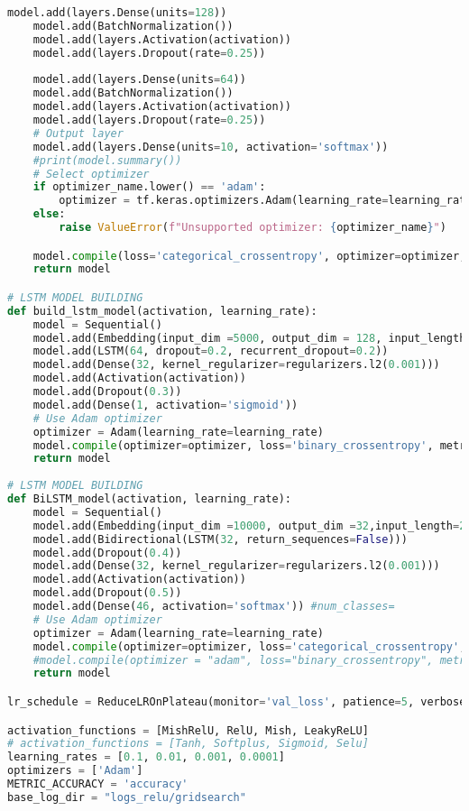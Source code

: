 \begin{lstlisting}[language=Python, ]
    model.add(layers.Dense(units=128))
    model.add(BatchNormalization())
    model.add(layers.Activation(activation))
    model.add(layers.Dropout(rate=0.25))
    
    model.add(layers.Dense(units=64))
    model.add(BatchNormalization())
    model.add(layers.Activation(activation))
    model.add(layers.Dropout(rate=0.25))
    # Output layer
    model.add(layers.Dense(units=10, activation='softmax'))
    #print(model.summary())
    # Select optimizer 
    if optimizer_name.lower() == 'adam':
        optimizer = tf.keras.optimizers.Adam(learning_rate=learning_rate)
    else:
        raise ValueError(f"Unsupported optimizer: {optimizer_name}")

    model.compile(loss='categorical_crossentropy', optimizer=optimizer, metrics=['accuracy'])
    return model

# LSTM MODEL BUILDING
def build_lstm_model(activation, learning_rate):
    model = Sequential()
    model.add(Embedding(input_dim =5000, output_dim = 128, input_length = 200))
    model.add(LSTM(64, dropout=0.2, recurrent_dropout=0.2))
    model.add(Dense(32, kernel_regularizer=regularizers.l2(0.001)))
    model.add(Activation(activation))
    model.add(Dropout(0.3))
    model.add(Dense(1, activation='sigmoid'))
    # Use Adam optimizer 
    optimizer = Adam(learning_rate=learning_rate)
    model.compile(optimizer=optimizer, loss='binary_crossentropy', metrics=['accuracy'])
    return model
    
# LSTM MODEL BUILDING
def BiLSTM_model(activation, learning_rate):
    model = Sequential()
    model.add(Embedding(input_dim =10000, output_dim =32,input_length=200))
    model.add(Bidirectional(LSTM(32, return_sequences=False)))
    model.add(Dropout(0.4))
    model.add(Dense(32, kernel_regularizer=regularizers.l2(0.001)))
    model.add(Activation(activation))
    model.add(Dropout(0.5))
    model.add(Dense(46, activation='softmax')) #num_classes=
    # Use Adam optimizer 
    optimizer = Adam(learning_rate=learning_rate)
    model.compile(optimizer=optimizer, loss='categorical_crossentropy', metrics=['accuracy'])
    #model.compile(optimizer = "adam", loss="binary_crossentropy", metrics=["accuracy"])
    return model

lr_schedule = ReduceLROnPlateau(monitor='val_loss', patience=5, verbose=1, factor=0.2, min_lr=1e-5)

activation_functions = [MishRelU, RelU, Mish, LeakyReLU]
# activation_functions = [Tanh, Softplus, Sigmoid, Selu]
learning_rates = [0.1, 0.01, 0.001, 0.0001]
optimizers = ['Adam']
METRIC_ACCURACY = 'accuracy'
base_log_dir = "logs_relu/gridsearch"


\end{lstlisting}
